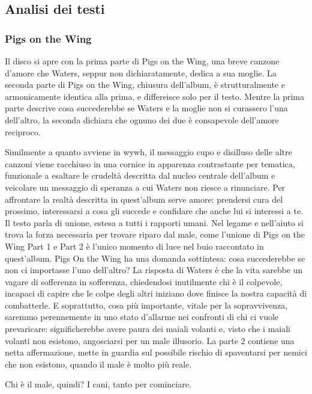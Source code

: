 \documentclass[class=book, crop=false, oneside, 12pt]{standalone}
\begin{document}
    \subsection{Analisi dei testi}
    \label{subsec:animals-lyrics}

    \subsubsection{Pigs on the Wing}
    Il disco si apre con la prima parte di Pigs on the Wing, una breve canzone d'amore che Waters, seppur non dichiaratamente, dedica a sua moglie. La seconda parte di Pigs on the Wing, chiusura dell'album, è strutturalmente e armonicamente  identica alla prima, e differeisce solo per il testo. Mentre la prima parte descrive cosa succederebbe se Waters e la moglie non si curassero l'una dell'altro, la seconda dichiara che ognuno dei due è consapevole dell'amore reciproco. 

    Similmente a quanto avviene in \acrlong{wywh}, il messaggio cupo e disilluso delle altre canzoni viene racchiuso in una cornice in apparenza contrastante per tematica, funzionale a esaltare le crudeltà descritta dal nucleo centrale dell'album e veicolare un messaggio di speranza a cui Waters non riesce a rinunciare. Per affrontare la realtà descritta in quest'album serve amore: prendersi cura del prossimo, interessarsi a cosa gli succede e confidare che anche lui si interessi a te. Il testo parla di unione, estesa a tutti i rapporti umani. Nel legame e nell'aiuto si trova la forza necessaria per trovare riparo dal male, come l'unione di Pigs on the Wing Part 1 e Part 2  è l'unico momento di luce nel buio raccontato in quest'album. Pigs On the Wing ha una domanda sottintesa: cosa succederebbe se non ci importasse l'uno dell'altro? La risposta di Waters è che la vita sarebbe un vagare di sofferenza in sofferenza, chiedendosi inutilmente chi è il colpevole, incapaci di capire che le colpe degli altri iniziano dove finisce la nostra capacità di combatterle. E soprattutto, cosa più importante, vitale per la sopravvivenza, saremmo perennemente in uno stato d'allarme nei confronti di chi ci vuole prevaricare: significherebbe avere paura dei maiali volanti e, visto che i maiali volanti non esistono, angosciarsi per un male illusorio. La parte 2 contiene una netta affermazione, mette in guardia sul possibile rischio di spaventarsi per nemici che non esistono, quando il male è molto più reale.

    Chi è il male, quindi? I cani, tanto per cominciare.
\end{document}
